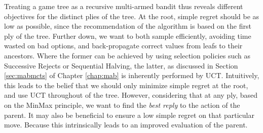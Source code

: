 \documentclass{kecsmstr}
\begin{document}
Treating a game tree as a recursive multi-armed bandit thus reveals different objectives for the distinct plies of the tree. At the root, simple regret should be as low as possible, since the recommendation of the algorithm is based on the first ply of the tree. Further down, we want to both sample efficiently, avoiding time wasted on bad options, and back-propagate correct values from leafs to their ancestors. Where the former can be achieved by using selection policies such as Successive Rejects or Sequential Halving, the latter, as discussed in Section \ref{sec:mabmcts} of Chapter \ref{chap:mab} is inherently performed by UCT. Intuitively, this leads to the belief that we should only minimize simple regret at the root, and use UCT throughout of the tree. However, considering that at any ply, based on the MinMax principle, we want to find the \emph{best reply} to the action of the parent. It may also be beneficial to ensure a low simple regret on that particular move. Because this intrinsically leads to an improved evaluation of the parent.
\end{document}
